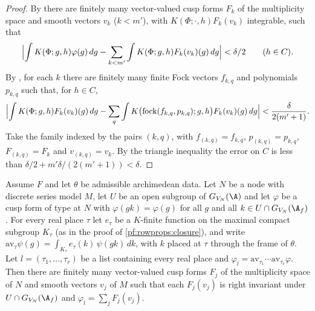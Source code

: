 \begin{proof}
By  there are finitely many vector-valued cusp forms $F_k$ of
the multiplicity space and smooth vectors $v_k$ ($k<m'$), with $K(\Phi;\cdot,h)F_k(v_k)$ integrable, such that
\[
\Bigl|\int K(\Phi;g,h)\varphi(g)\,dg-\sum_{k<m'}\int K(\Phi;g,h)F_k(v_k)(g)\,dg\Bigr|<\delta/2\qquad(h\in C).
\]
By , for each $k$ there are finitely many finite Fock vectors
$f_{k,q}$ and polynomials $p_{k,q}$ such that, for $h\in C$,
\[
\Bigl|\int K(\Phi;g,h)F_k(v_k)(g)\,dg-\sum_q\int K\bigl(\mathrm{fock}(f_{k,q},p_{k,q});g,h\bigr)F_k(v_k)(g)\,dg\Bigr|
<\frac{\delta}{2(m'+1)}.
\]
Take the family indexed by the pairs $(k,q)$, with
$f_{(k,q)}=f_{k,q}$, $p_{(k,q)}=p_{k,q}$, $F_{(k,q)}=F_k$ and $v_{(k,q)}=v_k$. By the triangle inequality the error on $C$
is less than $\delta/2+m'\delta/(2(m'+1))<\delta$.
\end{proof}

\begin{proposition}\label{pf:rowprops:kfinite}
Assume $F$ and let $\theta$ be admissible archimedean data. Let $N$ be a node with discrete series model $M$, let $U$ be an
open subgroup of $G_{V_N}(\A)$ and let $\varphi$ be a cusp form of type at $N$ with $\varphi(gk)=\varphi(g)$ for all $g$ and all
$k\in U\cap G_{V_N}(\A_f)$. For every real place $\tau$ let $e_\tau$ be a $K$-finite function on the maximal compact subgroup
$K_\tau$ (as in the proof of \cref{pf:rowprops:closure}), and write
$\mathrm{av}_\tau\psi(g)=\int_{K_\tau}e_\tau(k)\,\psi(gk)\,dk$, with $k$ placed at $\tau$ through the frame of $\theta$. Let
$l=(\tau_1,\dots,\tau_r)$ be a list containing every real place and $\varphi_l=\mathrm{av}_{\tau_1}\cdots\mathrm{av}_{\tau_r}\varphi$.
Then there are finitely many vector-valued cusp forms $F_j$ of the multiplicity space of $N$ and smooth vectors $v_j$ of $M$
such that each $F_j(v_j)$ is right invariant under $U\cap G_{V_N}(\A_f)$ and $\varphi_l=\sum_jF_j(v_j)$.
\end{proposition}

